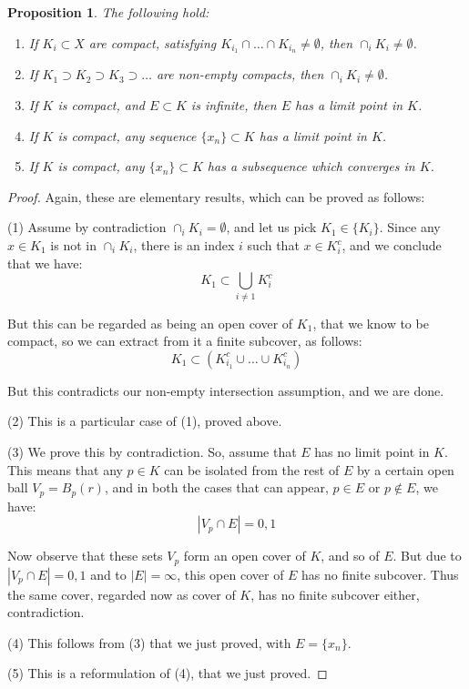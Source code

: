 \documentclass[12pt]{amsbook}
\newtheorem{proposition}[theorem]{Proposition}
\begin{document}
\begin{proposition}
The following hold:
\begin{enumerate}
\item If $K_i\subset X$ are compact, satisfying $K_{i_1}\cap\ldots\cap K_{i_n}\neq\emptyset$, then $\cap_iK_i\neq\emptyset$.

\item If $K_1\supset K_2\supset K_3\supset\ldots$ are non-empty compacts, then $\cap_iK_i\neq\emptyset$.

\item If $K$ is compact, and $E\subset K$ is infinite, then $E$ has a limit point in $K$.

\item If $K$ is compact, any sequence $\{x_n\}\subset K$ has a limit point in $K$.

\item If $K$ is compact, any $\{x_n\}\subset K$ has a subsequence which converges in $K$.
\end{enumerate}
\end{proposition}

\begin{proof}
Again, these are elementary results, which can be proved as follows:

\medskip

(1) Assume by contradiction $\cap_iK_i=\emptyset$, and let us pick $K_1\in\{K_i\}$. Since any $x\in K_1$ is not in $\cap_iK_i$, there is an index $i$ such that $x\in K_i^c$, and we conclude that we have:
$$K_1\subset\bigcup_{i\neq 1}K_i^c$$

But this can be regarded as being an open cover of $K_1$, that we know to be compact, so we can extract from it a finite subcover, as follows:
$$K_1\subset\left(K_{i_1}^c\cup\ldots\cup K_{i_n}^c\right)$$

But this contradicts our non-empty intersection assumption, and we are done.

\medskip

(2) This is a particular case of (1), proved above.

\medskip

(3) We prove this by contradiction. So, assume that $E$ has no limit point in $K$. This means that any $p\in K$ can be isolated from the rest of $E$ by a certain open ball $V_p=B_p(r)$, and in both the cases that can appear, $p\in E$ or $p\notin E$, we have:
$$|V_p\cap E|=0,1$$

Now observe that these sets $V_p$ form an open cover of $K$, and so of $E$. But due to $|V_p\cap E|=0,1$ and to $|E|=\infty$, this open cover of $E$ has no finite subcover. Thus the same cover, regarded now as cover of $K$, has no finite subcover either, contradiction.

\medskip

(4) This follows from (3) that we just proved, with $E=\{x_n\}$.

\medskip

(5) This is a reformulation of (4), that we just proved.
\end{proof}
\end{document}
